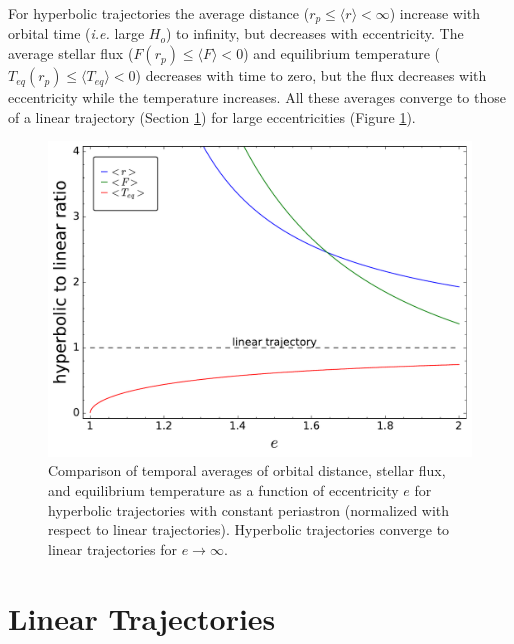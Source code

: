 \documentclass[a4paper,fleqn,usenatbib]{mnras}
\begin{document}
For hyperbolic trajectories the average distance ($r_p \leq \langle r \rangle < \infty$) increase with orbital time (\emph{i.e.} large $H_o$) to infinity, but decreases with eccentricity. The average stellar flux ($F(r_p) \leq \langle F \rangle < 0$) and equilibrium temperature ($T_{eq}(r_p) \leq \langle T_{eq} \rangle < 0$) decreases with time to zero, but the flux decreases with eccentricity while the temperature increases. All these averages converge to those of a linear trajectory (Section \ref{sec:linear}) for large eccentricities (Figure \ref{fig3}).

\begin{figure}
\includegraphics[width=\columnwidth]{f3.pdf}
\caption{Comparison of temporal averages of orbital distance, stellar flux, and equilibrium temperature as a function of eccentricity $e$ for hyperbolic trajectories with constant periastron (normalized with respect to linear trajectories). Hyperbolic trajectories converge to linear trajectories for $e \to \infty$.}
\label{fig3}
\end{figure}


\section{Linear Trajectories}
\label{sec:linear}
\end{document}
